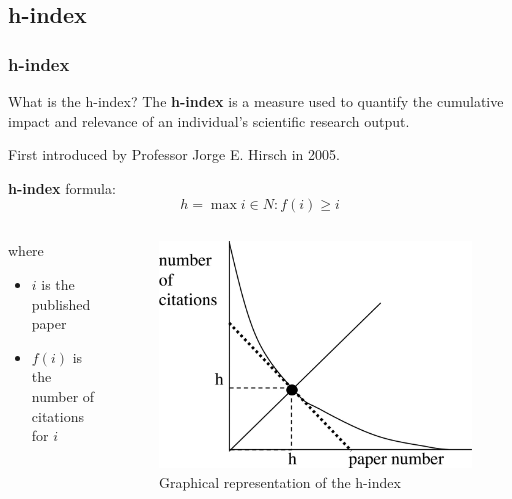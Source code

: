 \documentclass{beamer}
\begin{document}
\subsection{h-index}
\begin{frame}
    \frametitle{h-index}

    \begin{block}{What is the h-index?}
        The \textbf{h-index}\cite{hirsch2005index} is a measure used to quantify the cumulative impact
        and relevance of an individual’s scientific research output.
    \end{block}

    \begin{alertblock}{}
        First introduced by Professor Jorge E. Hirsch in 2005.
    \end{alertblock}
    \textbf{h-index} formula:
    \[
        h = \max i \in N:f(i) \geq i
    \]
    \vspace*{-20pt}
    \begin{columns}[T]
        \begin{column}{.5\textwidth}
            where
            \begin{itemize}
                \item $i$ is the published paper
                \item $f(i)$ is the number of citations for $i$
            \end{itemize}
        \end{column}
        \begin{column}{.5\textwidth}
            \begin{figure}[h]
                \includegraphics[height=0.3\textheight]{h-index_plot2.png}
                \caption{Graphical representation of the h-index}
            \end{figure}
        \end{column}
    \end{columns}
\end{frame}
\end{document}
